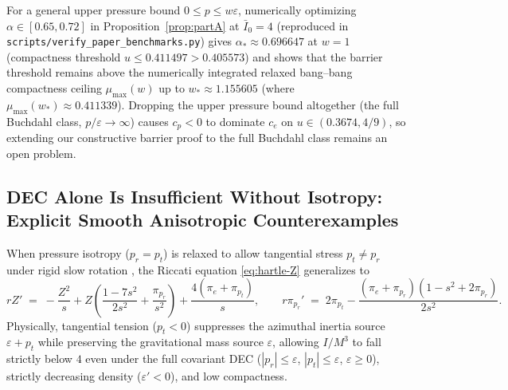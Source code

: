 \documentclass[11pt]{article}
\theoremstyle{plain}
\theoremstyle{definition}
\newcommand{\eps}{\varepsilon}
\newcommand{\Ibar}{\bar{I}}
\begin{document}
For a general upper pressure bound $0 \le p \le w \eps$, numerically optimizing $\alpha \in [0.65, 0.72]$ in Proposition~\ref{prop:partA} at $\Ibar_0 = 4$ (reproduced in \texttt{scripts/verify\_paper\_benchmarks.py}) gives $\alpha_* \approx 0.696647$ at $w=1$ (compactness threshold $u \le 0.411497 > 0.405573$) and shows that the barrier threshold remains above the numerically integrated relaxed bang--bang compactness ceiling $\mu_{\max}(w)$ up to $w_* \approx 1.155605$ (where $\mu_{\max}(w_*) \approx 0.411339$). Dropping the upper pressure bound altogether (the full Buchdahl class, $p/\eps \to \infty$) causes $c_p < 0$ to dominate $c_e$ on $u \in (0.3674, 4/9)$, so extending our constructive barrier proof to the full Buchdahl class remains an open problem.

\subsection{DEC Alone Is Insufficient Without Isotropy: Explicit Smooth Anisotropic Counterexamples}

When pressure isotropy ($p_r = p_t$) is relaxed to allow tangential stress $p_t \neq p_r$ under rigid slow rotation \cite{Silva2015}, the Riccati equation \eqref{eq:hartle-Z} generalizes to
\begin{equation}
  r Z' \;=\; -\frac{Z^2}{s} + Z\!\left(\frac{1 - 7 s^2}{2 s^2} + \frac{\pi_{p_r}}{s^2}\right) + \frac{4(\pi_e + \pi_{p_t})}{s},
  \qquad r\pi_{p_r}' \;=\; 2\pi_{p_t} - \frac{(\pi_e + \pi_{p_r})(1 - s^2 + 2\pi_{p_r})}{2 s^2}.
  \label{eq:aniso-hartle}
\end{equation}
Physically, tangential tension ($p_t < 0$) suppresses the azimuthal inertia source $\eps + p_t$ while preserving the gravitational mass source $\eps$, allowing $I/M^3$ to fall strictly below $4$ even under the full covariant DEC ($|p_r| \le \eps$, $|p_t| \le \eps$, $\eps \ge 0$), strictly decreasing density ($\eps' < 0$), and low compactness.
\end{document}
